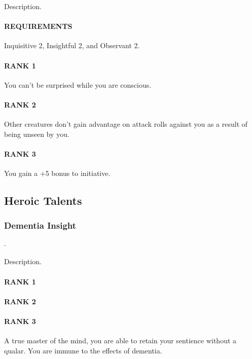 \normalsize
Description.
\paragraph{REQUIREMENTS} Inquisitive 2, Insightful 2, and Observant 2.
\paragraph{RANK 1} You can't be surprised while you are conscious.
\paragraph{RANK 2} Other creatures don't gain advantage on attack rolls against you as a result of being unseen by you.
\paragraph{RANK 3} You gain a +5 bonus to initiative.

\subsection*{Heroic Talents}
\subsubsection{Dementia Insight} \label{tal::dementiainsight}
\small{\textcolor{gray}{-}}

\normalsize
Description.
\paragraph{RANK 1} 
\paragraph{RANK 2} 
\paragraph{RANK 3} A true master of the mind, you are able to retain your sentience without a qualar.
You are immune to the effects of dementia.
